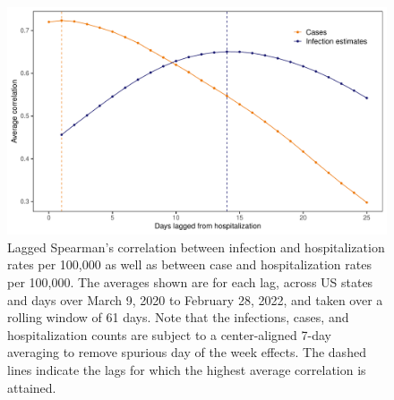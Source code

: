 \documentclass{article}
\begin{document}
\begin{figure}[!tb]
\centering
    \includegraphics[width=.8\textwidth]{infect_case_hosp_lag_corr_Nov2.pdf} 
    \caption{Lagged Spearman's correlation between infection and hospitalization
    rates per 100,000 as well as between case and hospitalization rates per
    100,000. The averages shown are for each lag, across US states and days
    over March 9, 2020 to February 28, 2022, and taken over a rolling window of
    61 days. Note that the infections, cases, and hospitalization counts are
    subject to a center-aligned 7-day averaging to remove spurious day of the
    week effects. The dashed lines indicate the lags for which the highest
    average correlation is attained.}
    \label{fig:infect_case_hosp_lag_corr}
\end{figure}
\end{document}
